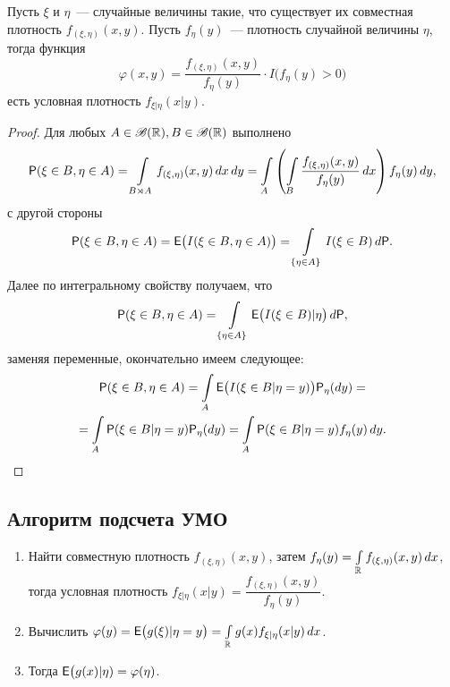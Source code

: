  \begin{theorem}
 	Пусть $\xi$ и $\eta$~--- случайные величины такие, что существует их совместная 
 	плотность $f_{(\xi, \eta)} (x, y)$. Пусть $f_\eta (y)$~--- плотность случайной 
 	величины $\eta$, тогда функция 
 	$$\varphi(x, y) = 
 	\dfrac{f_{(\xi, \eta)} (x, y)}{f_\eta (y)} \cdot I \big(f_\eta(y) > 0 \big)$$ 
 	есть условная плотность $f_{\xi |\eta} (x | y)$.
 	\begin{proof}
 		Для любых $A \in \B(\R), B \in \B(\R)$ выполнено
 		\begin{multline*}
 			\P(\xi \in B, \eta \in A) = 
 			\int\limits_{B \rtimes A} f_{(\xi, \eta)} (x, y) \, dx \, dy = 
 			\int\limits_A \left( \int\limits_B \dfrac{f_{(\xi, \eta)} 
 			(x, y)}{f_\eta(y)} \, dx \right) f_\eta(y) \, dy,
 		\end{multline*}
 		с другой стороны
 		\begin{equation*}
 			\P( \xi \in B, \eta \in A) = \E \big( I (\xi \in B, \eta \in A) \big) = 
 			\int\limits_{\{\eta \in A \}} I(\xi \in B) \, d\P.
 		\end{equation*}
 		Далее по интегральному свойству получаем, что
 		\begin{equation*}
 			\P( \xi \in B, \eta \in A) = 
 			\int\limits_{\{\eta \in A \}} \E  \big( I(\xi \in B) | \eta \big) \, d\P,
 		\end{equation*}
 		заменяя переменные, окончательно имеем следующее:
 		\begin{multline*}
 			\P( \xi \in B, \eta \in A) = 
 			\int\limits_A \E \big( I (\xi \in B | \eta = y) \big) \P_\eta(d y) =\\ 
 			= \int\limits_A \P(\xi \in B | \eta = y) \P_\eta(dy) = 
 			\int\limits_A \P( \xi \in B | \eta = y) f_\eta (y) \, dy.
 		\end{multline*}
 	\end{proof}
 \end{theorem}
 \subsection{Алгоритм подсчета УМО}
 \begin{enumerate}
 	\item {Найти совместную плотность $f_{(\xi, \eta)} (x, y)$, затем 
 		$f_\eta (y) = \int\limits_\R f_{(\xi, \eta)} (x, y) \, dx$, тогда условная
 	 	плотность $f_{ \xi | \eta } (x | y) = \dfrac{f_{(\xi, \eta)} (x, y)}{f_\eta (y)}$.}
 	\item {Вычислить $\varphi(y) = \E \big( g(\xi) | \eta = y \big) = 
 		\int\limits_\R g(x) f_{ \xi | \eta } (x | y) \, dx $.}
 	\item {Тогда $\E  \big( g(x) | \eta) = \varphi(\eta)$.}
 \end{enumerate}
 
